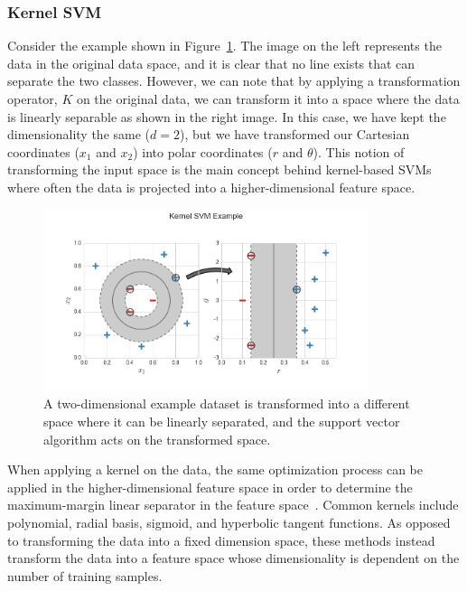 \subsubsection{Kernel SVM}

Consider the example shown in Figure~\ref{fig:kernelSvmExample}.
%
The image on the left represents the data in the original data space, and it is clear that no line exists that can separate the two classes.
%
However, we can note that by applying a transformation operator, $K$ on the original data, we can transform it into a space where the data is linearly separable as shown in the right image.
%
In this case, we have kept the dimensionality the same ($d=2$), but we have transformed our Cartesian coordinates ($x_1$ and $x_2$) into polar coordinates ($r$ and $\theta$).
%
This notion of transforming the input space is the main concept behind kernel-based SVMs where often the data is projected into a higher-dimensional feature space.

\begin{figure}[t]
  \centering
  \includegraphics[width=0.85\textwidth]{figs/chap3/kernelSvmExample}
  \caption[Kernel Support Vector Machine Example]{A two-dimensional example dataset is transformed into a different space where it can be linearly separated, and the support vector algorithm acts on the transformed space.}
  \label{fig:kernelSvmExample}
\end{figure}

When applying a kernel on the data, the same optimization process can be applied in the higher-dimensional feature space in order to determine the maximum-margin linear separator in the feature space~\cite{BoserGuyonVapnik1992}.
%
Common kernels include polynomial, radial basis, sigmoid, and hyperbolic tangent functions.
%
As opposed to transforming the data into a fixed dimension space, these methods instead transform the data into a feature space whose dimensionality is dependent on the number of training samples.

